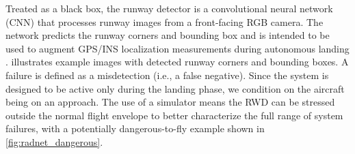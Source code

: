 Treated as a black box, the runway detector is a convolutional neural network (CNN) that processes runway images from a front-facing RGB camera. The network predicts the runway corners and bounding box and is intended to be used to augment GPS/INS localization measurements during autonomous landing \cite{durand2023formal}.
 illustrates example images with detected runway corners and bounding boxes.
A failure is defined as a misdetection (i.e., a false negative). Since the system is designed to be active only during the landing phase, we condition on the aircraft being on an approach.
The use of a simulator means the RWD can be stressed outside the normal flight envelope to better characterize the full range of system failures, with a potentially dangerous-to-fly example shown in \cref{fig:radnet_dangerous}.


